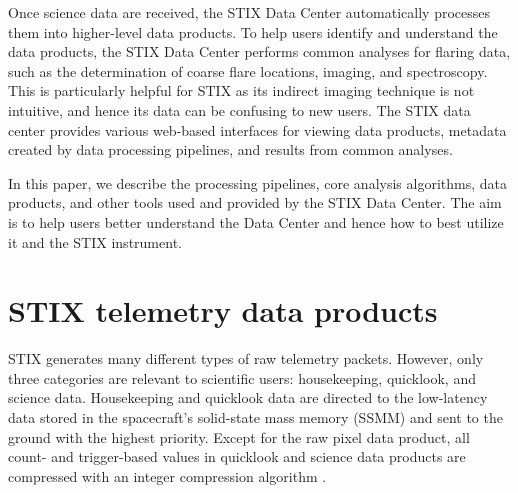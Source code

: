 \documentclass[referee]{preaa} %
\begin{document}
Once science data are received, the STIX Data Center automatically processes them into higher-level data products. To help users identify and understand the data products,  the STIX Data Center performs common analyses for flaring data, such as  the determination of coarse flare locations, imaging, and spectroscopy.   This is particularly helpful for STIX as its indirect imaging technique is not intuitive, and hence its data can be confusing to new users.  The STIX data center provides various web-based interfaces for viewing data products, metadata created by data processing pipelines,   and results from common analyses. 



 In this paper, we describe the processing pipelines, core analysis algorithms, data products, and other tools used and provided by the STIX Data Center.  The aim is to help users better understand the Data Center and hence how to best utilize it and the STIX instrument.

\section{STIX telemetry data products}
\label{sec:raw-data}
STIX generates many different types of raw telemetry packets.
However, only three categories are relevant to scientific users: housekeeping, quicklook, and  science data. Housekeeping and quicklook data are directed to the low-latency data stored in the spacecraft's solid-state mass memory (SSMM) and sent to the ground with the highest priority.
Except for the raw pixel data product, all count- and trigger-based values in quicklook and  science data products are compressed with an integer compression algorithm \citep{stix2020}.
\end{document}
